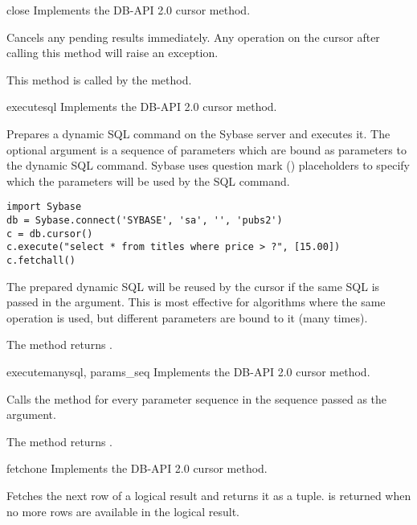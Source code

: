 \begin{methoddesc}[Cursor]{close}{}
Implements the DB-API 2.0 cursor  method.

Cancels any pending results immediately.  Any operation on the cursor
after calling this method will raise an exception.

This method is called by the  method.
\end{methoddesc}

\begin{methoddesc}[Cursor]{execute}{sql }
Implements the DB-API 2.0 cursor  method.

Prepares a dynamic SQL command on the Sybase server and executes it.
The optional  argument is a sequence of parameters which
are bound as parameters to the dynamic SQL command.  Sybase uses
question mark () placeholders to specify which the parameters
will be used by the SQL command.

\begin{verbatim}
import Sybase
db = Sybase.connect('SYBASE', 'sa', '', 'pubs2')
c = db.cursor()
c.execute("select * from titles where price > ?", [15.00])
c.fetchall()
\end{verbatim}

The prepared dynamic SQL will be reused by the cursor if the same SQL
is passed in the  argument.  This is most effective for
algorithms where the same operation is used, but different parameters
are bound to it (many times).

The method returns .
\end{methoddesc}

\begin{methoddesc}[Cursor]{executemany}{sql, params_seq}
Implements the DB-API 2.0 cursor  method.

Calls the  method for every parameter sequence in
the sequence passed as the  argument.

The method returns .
\end{methoddesc}

\begin{methoddesc}[Cursor]{fetchone}{}
Implements the DB-API 2.0 cursor  method.

Fetches the next row of a logical result and returns it as a tuple.
 is returned when no more rows are available in the logical
result.
\end{methoddesc}

